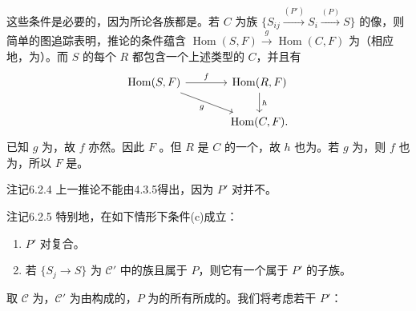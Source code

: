 这些条件是必要的，因为所论各族都是。若 $C$ 为族 $\{S_{ij}\xrightarrow{(P')}S_i\xrightarrow{(P)}S\}$ 的像，则简单的图追踪表明，推论的条件蕴含 $\operatorname{Hom}(S,F)\xrightarrow{g}\operatorname{Hom}(C,F)$ 为（相应地，为）。而 $S$ 的每个 $R$ 都包含一个上述类型的 $C$，并且有
\[
\begin{tikzcd}[column sep=large]
\operatorname{Hom}(S,F)\arrow[r,"f"]\arrow[dr,"g"']&\operatorname{Hom}(R,F)\arrow[d,"h"]\\
&\operatorname{Hom}(C,F).
\end{tikzcd}
\]
已知 $g$ 为，故 $f$ 亦然。因此 $F$ 。但 $R$ 是 $C$ 的一个，故 $h$ 也为。若 $g$ 为，则 $f$ 也为，所以 $F$ 是。
\begin{SGAresult}{注记}{6.2.4}
上一推论不能由4.3.5得出，因为 $P'$ 对并不。
\end{SGAresult}
\begin{SGAresult}{注记}{6.2.5}
特别地，在如下情形下条件(c)成立：
\begin{enumerate}
\item[(i)] $P'$ 对复合。
\item[(ii)] 若 $\{S_j\to S\}$ 为 $\mathcal C'$ 中的族且属于 $P$，则它有一个属于 $P'$ 的子族。
\end{enumerate}
\end{SGAresult}
取 $\mathcal C$ 为，$\mathcal C'$ 为由构成的，$P$ 为的所有所成的。我们将考虑若干 $P'$：
